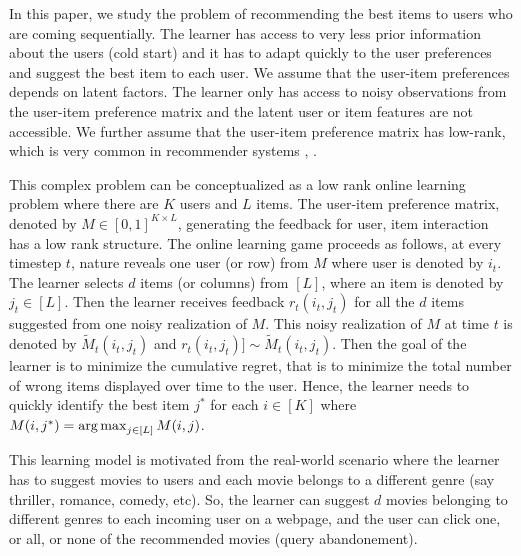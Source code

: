 In this paper, we study the problem of recommending the best items to users who are coming sequentially. The learner has access to very less prior information about the users (cold start) and it has to adapt quickly to the user preferences and suggest the best item to each user. We assume that the user-item preferences depends on latent factors. The learner only has access to noisy observations from the user-item preference matrix and the latent user or item features are not accessible. We further assume that the user-item preference matrix has low-rank, which is very common in recommender systems \citep{koren2009matrix}, \citep{ricci2011liorrokach}. %

	This complex problem can be conceptualized as a low rank online learning  problem where there are $K$ users and $L$ items. The user-item preference  matrix, denoted by $M\in [0,1]^{K\times L}$,  generating the feedback for user, item interaction has a low rank structure. The online learning game proceeds as follows, at every timestep $t$,  nature reveals one user (or row) from $M$ where user is denoted by $i_t$. The learner selects $d$ items (or columns) from $[L]$, where an item is denoted by $j_t\in [L]$. Then the learner receives feedback $r_{t}(i_t,j_t)$ for all the $d$ items suggested from one noisy realization of $M$. This noisy realization of $M$ at time $t$ is denoted by $\tilde{M}_t(i_t,j_t)$ and  $r_{t}(i_t,j_t)] \sim \tilde{M}_t(i_t,j_t)$. Then the goal of the learner is to minimize the cumulative regret, that is to minimize the total number of wrong items displayed over time to the user. Hence, the learner needs to quickly identify the best item $j^*$ for each $i\in [K]$ where $M(i,j^*) = \mathop{\rm arg\,max} _{j\in[L]} M(i,j)$. 
	
	This learning model is motivated from the real-world scenario where the learner has  to suggest movies to users and each movie belongs to a different genre (say thriller, romance, comedy, etc). So, the learner can suggest $d$ movies belonging to different genres to each incoming user on a webpage, and the user can click one, or all, or none of the recommended movies (query abandonement).	
	
